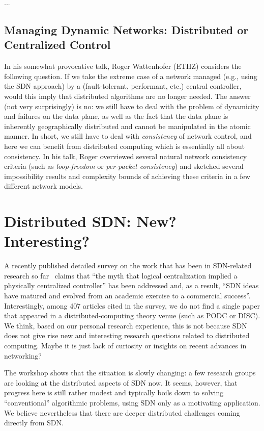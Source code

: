 \documentclass[11pt,pdftex,letter]{article}
\begin{document}
...

\subsection{Managing Dynamic Networks: Distributed or Centralized
  Control}

In his somewhat provocative talk, Roger Wattenhofer (ETHZ) considers
the following question. If we take the extreme case of a network 
managed (e.g., using the SDN approach) by a (fault-tolerant,
performant, etc.) central controller, would this imply
that distributed algorithms are no longer needed. The answer (not very
surprisingly) is no: we still have to deal with the problem of
dynamicity and failures on the data plane, as well as the fact that
the data plane is inherently geographically distributed and cannot be
manipulated in the atomic manner. In short, we still have to deal with
\emph{consistency} of network control, and here we can benefit from
distributed computing which is essentially all about consistency. 
In his talk, Roger overviewed several natural network consistency
criteria (such as \emph{loop-freedom} or \emph{per-packet
  consistency}) and sketched several impossibility results and
complexity bounds of achieving these criteria in a few different
network models.   


\section{Distributed SDN: New? Interesting?}

A recently published detailed survey on the work that has been in
SDN-related research so far~\cite{sdn-survey} 
claims that ``the myth that logical centralization implied
a physically centralized controller'' has been addressed and, as a
result, ``SDN ideas have matured and evolved from
an academic exercise to a commercial success''. 
Interestingly, among 407 articles cited in the survey, we do not find
a single paper that appeared in a distributed-computing theory venue
(such as PODC or DISC).
We think, based on our personal research experience, this is not
because SDN does not give rise new and interesting
research questions related to distributed computing. 
Maybe it is just lack of curiosity or insights on recent
advances in networking?  
 
The workshop shows that the situation is slowly changing: a few
research groups are looking at the distributed aspects of SDN now.    
It seems, however, that progress here is still rather modest and
typically boils down to solving ``conventional'' algorithmic problems, 
using SDN only as a motivating application. We believe nevertheless that
there are deeper distributed challenges coming directly from SDN.  



\end{document}
